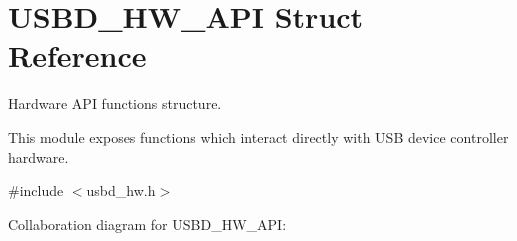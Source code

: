 \hypertarget{structUSBD__HW__API}{}\section{U\+S\+B\+D\+\_\+\+H\+W\+\_\+\+A\+PI Struct Reference}
\label{structUSBD__HW__API}


Hardware A\+PI functions structure.

This module exposes functions which interact directly with U\+SB device controller hardware.  




{\ttfamily \#include $<$usbd\+\_\+hw.\+h$>$}



Collaboration diagram for U\+S\+B\+D\+\_\+\+H\+W\+\_\+\+A\+PI\+:

